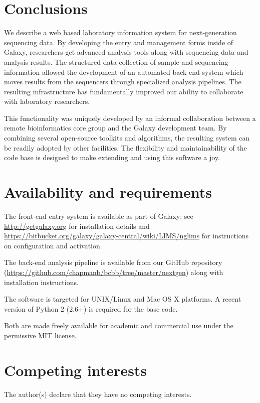 \documentclass[10pt]{bmc_article}
\newenvironment{bmcformat}{\begin{raggedright}\baselineskip20pt\sloppy\setboolean{publ}{false}}{\end{raggedright}\baselineskip20pt\sloppy}
\begin{document}
\begin{bmcformat}
\section*{Conclusions}

We describe a web based laboratory information system for
next-generation sequencing data. By developing the entry and
management forms inside of Galaxy, researchers get advanced analysis
tools along with sequencing data and analysis results. The structured
data collection of sample and sequencing information allowed the
development of an automated back end system which moves results from
the sequencers through specialized analysis pipelines. The resulting
infrastructure has fundamentally improved our ability to collaborate
with laboratory researchers.

This functionality was uniquely developed by an informal collaboration
between a remote bioinformatics core group and the Galaxy development
team. By combining several open-source toolkits and algorithms, the
resulting system can be readily adopted by other facilities. The
flexibility and maintainability of the code base is designed to make
extending and using this software a joy.

\section*{Availability and requirements}

The front-end entry system is available as part of Galaxy; see
\url{http://getgalaxy.org} for installation details and
\url{https://bitbucket.org/galaxy/galaxy-central/wiki/LIMS/nglims} for
instructions on configuration and activation.

The back-end analysis pipeline is available from our GitHub repository
(\url{https://github.com/chapmanb/bcbb/tree/master/nextgen}) along
with installation instructions.

The software is targeted for UNIX/Linux and Mac OS X platforms. A
recent version of Python 2 (2.6+) is required for the base code.

Both are made freely available for academic and commercial use
under the permissive MIT license.

\section*{Competing interests}

The author(s) declare that they have no competing interests.


\end{bmcformat}
\end{document}
